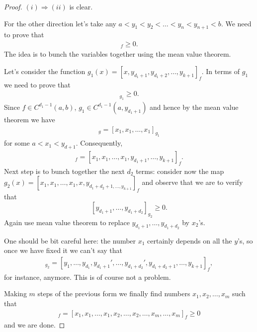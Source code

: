 \begin{proof}
	$(i) \Rightarrow (ii)$ is clear.

	For the other direction let's take any $a < y_{1} < y_{2} < \ldots < y_{n} < y_{n + 1} < b$. We need to prove that
	\begin{align*}
		[y_{1}, y_{2}, \ldots, y_{k}, y_{k + 1}]_{f} \geq 0.
	\end{align*}
	The idea is to bunch the variables together using the mean value theorem.

	Let's consider the function $g_{1}(x) = [x, y_{d_{1} + 1}, y_{d_{1} + 2}, \ldots, y_{k + 1}]_{f}$. In terms of $g_{1}$ we need to prove that
	\begin{align*}
		[y_{1}, y_{2}, \ldots, y_{d + 1}]_{g_{1}} \geq 0.
	\end{align*}
	Since $f \in C^{d_{1} - 1}(a, b)$, $g_{1} \in C^{d_{1} - 1}(a, y_{d_{1} + 1})$ and hence by the mean value theorem we have
	\begin{align*}
		[y_{1}, y_{2}, \ldots, y_{d_{1}}]_{g} = [x_{1}, x_{1}, \ldots, x_{1}]_{g_{1}}
	\end{align*}
	for some $a < x_{1} < y_{d + 1}$. Consequently,
	\begin{align*}
		[y_{1}, y_{2}, \ldots, y_{k}, y_{k + 1}]_{f} = [x_{1}, x_{1}, \ldots, x_{1}, y_{d_{1} + 1}, \ldots, y_{k + 1}]_{f}.
	\end{align*}
	Next step is to bunch together the next $d_{2}$ terms: consider now the map $g_{2}(x) = [x_{1}, x_{1}, \ldots, x_{1}, x, y_{d_{1} + d_{2} + 1, \ldots, y_{k + 1}}]_{f}$ and observe that we are to verify that
	\[
		[y_{d_{1} + 1}, \ldots, y_{d_{1} + d_{2}}]_{g_{2}} \geq 0.
	\]
	Again use mean value theorem to replace $y_{d_{1} + 1}, \ldots, y_{d_{1} + d_{2}}$ by $x_{2}$'s.

	One should be bit careful here: the number $x_{1}$ certainly depends on all the $y$'s, so once we have fixed it we can't say that
	\begin{align*}
		[y_{d_{1} + 1}', y_{d_{1} + 2}', \ldots, y_{d_{1} + d_{2}}']_{g_{2}} = [y_{1}, \ldots, y_{d_{1}}, y_{d_{1} + 1}', \ldots, y_{d_{1} + d_{2}}', y_{d_{1} + d_{2} + 1}, \ldots, y_{k + 1}]_{f},
	\end{align*}
	for instance, anymore. This is of course not a problem.

	Making $m$ steps of the previous form we finally find numbers $x_{1}, x_{2}, \ldots, x_{m}$ such that
	\begin{align*}
		[y_{1}, y_{2}, \ldots, y_{k}, y_{k + 1}]_{f} = [x_{1}, x_{1}, \ldots, x_{1}, x_{2}, \ldots, x_{2}, \ldots, x_{m}, \ldots, x_{m}]_{f} \geq 0
	\end{align*}
	and we are done.
\end{proof}

